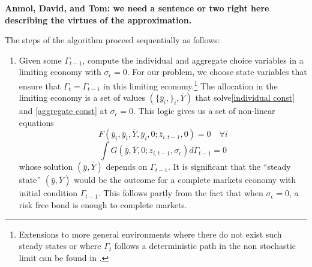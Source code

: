 \documentclass[thmsb,11pt]{article}
\begin{document}
\textbf{Anmol, David, and Tom: we need a sentence or two right here describing the virtues of the approximation.}

\color{black}


The steps of the algorithm proceed sequentially as follows:

\begin{enumerate}
\item Given some $\Gamma_{t-1}$, compute the individual and aggregate choice variables in a limiting economy with $\sigma_{\epsilon}=0$. For our problem, we choose state variables that ensure that  $\Gamma_{t}=\Gamma_{t-1}$ in this limiting economy.\footnote{Extensions to more general environments where there do not exist such steady states or where $\Gamma_t$ follows a deterministic path in the non stochastic limit can be found in \cite{Evans2014}.} The allocation in the limiting economy is a set of values $\left(\{\bar{y}_i,\}_i,\bar{Y}\right)$ that solve\eqref{individual const} and \eqref{aggregate const} at $\sigma_\epsilon=0$. This logic gives us a set of non-linear equations
\begin{equation}
	\label{individual const ss}
			F(\bar y_{i}, \bar{y}_i, \bar{Y}, \bar{y}_i ,0; \bar{z}_{i,t-1},0) = 0  \quad \forall i
	\end{equation}	
	\begin{equation}
	\label{aggregate const ss}
		\int G(\bar{y},\bar{Y},0;z_{i,t-1},\sigma_\epsilon) d\Gamma_{t-1}= 0	
	\end{equation}
whose solution $(\bar{y},\bar{Y})$  depends on $\Gamma_{t-1}$.  It is significant that the ``steady state'' $(\bar{y},\bar{Y})$ would be the outcome
for a complete markets economy  with initial condition $\Gamma_{t-1}$. This follows partly from the fact that when $\sigma_\epsilon=0$,
a risk free bond is enough to complete markets.


\end{enumerate}
\end{document}

